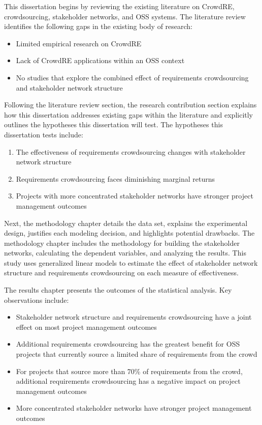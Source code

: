 This dissertation begins by reviewing the existing literature on CrowdRE, crowdsourcing, stakeholder networks, and OSS systems. The literature review identifies the following gaps in the existing body of research: 
\begin{itemize}
    \item Limited empirical research on CrowdRE
    \item Lack of CrowdRE applications within an OSS context
    \item No studies that explore the combined effect of requirements crowdsourcing and stakeholder network structure
\end{itemize}
Following the literature review section, the research contribution section explains how this dissertation addresses existing gaps within the literature and explicitly outlines the hypotheses this dissertation will test. The hypotheses this dissertation tests include:
\begin{enumerate}
    \item The effectiveness of requirements crowdsourcing changes with stakeholder network structure
    \item Requirements crowdsourcing faces diminishing marginal returns
    \item Projects with more concentrated stakeholder networks have stronger project management outcomes
\end{enumerate}
Next, the methodology chapter details the data set, explains the experimental design, justifies each modeling decision, and highlights potential drawbacks. The methodology chapter includes the methodology for building the stakeholder networks, calculating the dependent variables, and analyzing the results. This study uses generalized linear models to estimate the effect of stakeholder network structure and requirements crowdsourcing on each measure of effectiveness.

The results chapter presents the outcomes of the statistical analysis. Key observations include: 
\begin{itemize}
    \item Stakeholder network structure and requirements crowdsourcing have a joint effect on most project management outcomes
    \item Additional requirements crowdsourcing has the greatest benefit for OSS projects that currently source a limited share of requirements from the crowd
    \item For projects that source more than 70\% of requirements from the crowd, additional requirements crowdsourcing has a negative impact on project management outcomes
    \item More concentrated stakeholder networks have stronger project management outcomes
\end{itemize}

